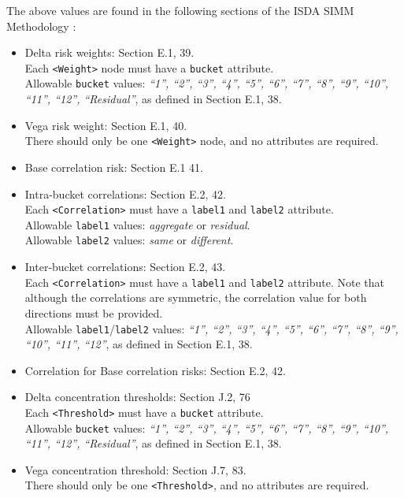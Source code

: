 The above values are found in the following sections of the ISDA SIMM Methodology \cite{SIMM2.5A}:
\begin{itemize}
  \item Delta risk weights: Section E.1, 39. \\
    Each {\tt <Weight>} node must have a {\tt bucket} attribute.\\
    Allowable {\tt bucket} values: \emph{``1'', ``2'', ``3'', ``4'', ``5'', ``6'', ``7'', ``8'', ``9'', ``10'', ``11'', ``12'', ``Residual''}, as defined in Section E.1, 38.
  \item Vega risk weight: Section E.1, 40. \\
    There should only be one {\tt <Weight>} node, and no attributes are required.
  \item Base correlation risk: Section E.1 41.
  \item Intra-bucket correlations: Section E.2, 42. \\
    Each {\tt <Correlation>} must have a {\tt label1} and {\tt label2} attribute. \\
    Allowable {\tt label1} values: \emph{aggregate} or \emph{residual}. \\
    Allowable {\tt label2} values: \emph{same} or \emph{different}.
  \item Inter-bucket correlations: Section E.2, 43. \\
    Each {\tt <Correlation>} must have a {\tt label1} and {\tt label2} attribute. Note that although the correlations
    are symmetric, the correlation value for both directions must be provided. \\
    Allowable {\tt label1}/{\tt label2} values: \emph{``1'', ``2'', ``3'', ``4'', ``5'', ``6'', ``7'', ``8'', ``9'', ``10'', ``11'', ``12''}, as defined in Section E.1, 38.
  \item Correlation for Base correlation risks: Section E.2, 42.
  \item Delta concentration thresholds: Section J.2, 76 \\
    Each {\tt <Threshold>} must have a {\tt bucket} attribute. \\
    Allowable {\tt bucket} values: \emph{``1'', ``2'', ``3'', ``4'', ``5'', ``6'', ``7'', ``8'', ``9'', ``10'', ``11'', ``12'', ``Residual''}, as defined in Section E.1, 38.
  \item Vega concentration threshold: Section J.7, 83. \\
    There should only be one {\tt <Threshold>}, and no attributes are required.
\end{itemize}

